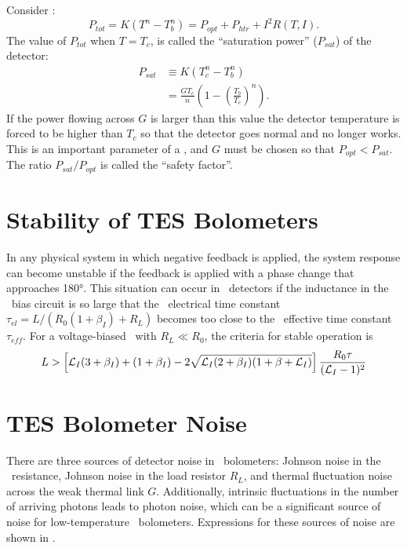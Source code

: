 Consider :
\begin{equation}\label{eqn:ch3-tes-ptot-2}
P_{tot} = K(T^n - T_b^n) = P_{opt} + P_{htr} + I^2 R(T,I).
\end{equation}
The value of $P_{tot}$ when $T = T_c$, is called the ``saturation power'' ($P_{sat}$) of the detector:
\begin{align}
  P_{sat} & \equiv K(T_c^n - T_b^n) \\
         & = \frac{G T_c}{n} \left( 1 - \left(\frac{T_b}{T_c}\right)^n \right).
 \label{eqn:ch3-psat}
\end{align}
If the power flowing across $G$ is larger than this value the detector temperature is forced to be higher than $T_c$ so that the detector goes normal and no longer works.
This is an important parameter of a \TES, and $G$ must be chosen so that $P_{opt} < P_{sat}$. 
The ratio $P_{sat} / P_{opt}$ is called the ``safety factor''.

\section{Stability of \textsc{TES} Bolometers} \label{sec:ch3-tes-stability}

In any physical system in which negative feedback is applied, the system response can become unstable if the feedback is applied with a phase change that approaches \ang{180}.
This situation can occur in \TES\ detectors if the inductance in the \TES\ bias circuit is so large that the \TES\ electrical time constant $\tau_{el} = L/(R_0(1+\beta_I) + R_L)$ becomes too close to the \TES\ effective time constant $\tau_{eff}$.
For a voltage-biased \TES\ with $R_L \ll R_0$, the criteria for stable operation is \cite{irwin_transition-edge_2005}
\begin{equation}
  \label{eqn:ch3-L-stable}
  L > \left[ \mathcal{L}_I(3 + \beta_I) + (1 + \beta_I) - 2\sqrt{\mathcal{L}_I(2+\beta_I)(1 + \beta + \mathcal{L}_I)} \right] \frac{R_0 \tau}{(\mathcal{L}_I-1)^2}
\end{equation}

\section{\textsc{TES} Bolometer Noise} \label{sec:ch3-tes-noise}

There are three sources of detector noise in \TES\ bolometers: Johnson noise in the \TES\ resistance, Johnson noise in the load resistor $R_L$, and thermal fluctuation noise across the weak thermal link $G$.
Additionally, intrinsic fluctuations in the number of arriving photons leads to photon noise, which can be a significant source of noise for low-temperature \TES\ bolometers.
Expressions for these sources of noise are shown in .

